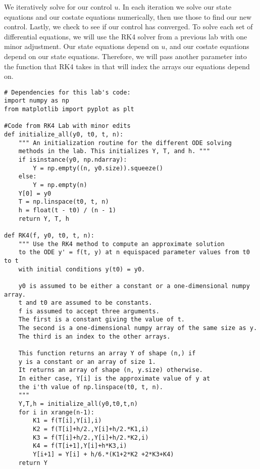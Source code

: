 We iteratively solve for our control $u$.
In each iteration we solve our state equations and our costate equations numerically, then use those to find our new control.
Lastly, we check to see if our control has converged.
To solve each set of differential equations, we will use the RK4 solver from a previous lab with one minor adjustment.
Our state equations depend on $u$, and our costate equations depend on our state equations.
Therefore, we will pass another parameter into the function that RK4 takes in that will index the arrays our equations depend on.

\begin{lstlisting}
# Dependencies for this lab's code:
import numpy as np
from matplotlib import pyplot as plt

#Code from RK4 Lab with minor edits				
def initialize_all(y0, t0, t, n):
    """ An initialization routine for the different ODE solving
    methods in the lab. This initializes Y, T, and h. """
    if isinstance(y0, np.ndarray):
        Y = np.empty((n, y0.size)).squeeze()
    else:
        Y = np.empty(n)
    Y[0] = y0
    T = np.linspace(t0, t, n)
    h = float(t - t0) / (n - 1)
    return Y, T, h

def RK4(f, y0, t0, t, n):
    """ Use the RK4 method to compute an approximate solution
    to the ODE y' = f(t, y) at n equispaced parameter values from t0 to t
    with initial conditions y(t0) = y0.
    
    y0 is assumed to be either a constant or a one-dimensional numpy array.
    t and t0 are assumed to be constants.
    f is assumed to accept three arguments.
    The first is a constant giving the value of t.
    The second is a one-dimensional numpy array of the same size as y.
    The third is an index to the other arrays.
    
    This function returns an array Y of shape (n,) if
    y is a constant or an array of size 1.
    It returns an array of shape (n, y.size) otherwise.
    In either case, Y[i] is the approximate value of y at
    the i'th value of np.linspace(t0, t, n).
    """
    Y,T,h = initialize_all(y0,t0,t,n)
    for i in xrange(n-1):
        K1 = f(T[i],Y[i],i)
        K2 = f(T[i]+h/2.,Y[i]+h/2.*K1,i)
        K3 = f(T[i]+h/2.,Y[i]+h/2.*K2,i)
        K4 = f(T[i+1],Y[i]+h*K3,i)
        Y[i+1] = Y[i] + h/6.*(K1+2*K2 +2*K3+K4)
    return Y
\end{lstlisting}

